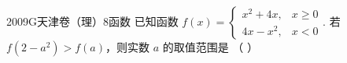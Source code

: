 
\begin{problem}{2009}{G}{天津卷（理）}{8}{函数}
已知函数 $f(x)=\begin{cases} x^2+4x, & x\geq 0 \\ 4x-x^2, & x<0 \end{cases}$. 若 $f(2-a^2)>f(a)$，则实数 $a$ 的取值范围是 \hspace{1cm} （ ）
\begin{choices}
\end{choices}
\end{problem}

\begin{answer}

\end{answer}

\begin{solutions}

\end{solutions}